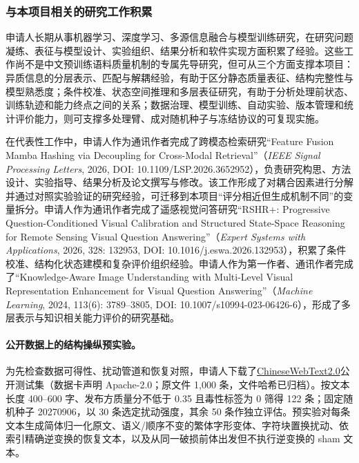 \justifying
\NSFCBodyText

\subsubsection{与本项目相关的研究工作积累}

申请人长期从事机器学习、深度学习、多源信息融合与模型训练研究，在研究问题凝练、表征与模型设计、实验组织、结果分析和软件实现方面积累了经验。这些工作尚不是中文预训练语料质量机制的专属先导研究，但可从三个方面支撑本项目：异质信息的分层表示、匹配与解耦经验，有助于区分静态质量表征、结构完整性与模型熟悉度；条件校准、状态空间推理和多层表征研究，有助于分析处理前状态、训练轨迹和能力终点之间的关系；数据治理、模型训练、自动实验、版本管理和统计评价能力，则可支撑多处理臂、成对随机种子与冻结协议的可复现实施。

在代表性工作中，申请人作为通讯作者完成了跨模态检索研究“Feature Fusion Mamba Hashing via Decoupling for Cross-Modal Retrieval”（\emph{IEEE Signal Processing Letters}, 2026, DOI: 10.1109/LSP.2026.3652952），负责研究构思、方法设计、实验指导、结果分析及论文撰写与修改。该工作形成了对耦合因素进行分解并通过对照实验验证的研究经验，可迁移到本项目“评分相近但生成机制不同”的变量拆分。申请人作为通讯作者完成了遥感视觉问答研究“RSHR+: Progressive Question-Conditioned Visual Calibration and Structured State-Space Reasoning for Remote Sensing Visual Question Answering”（\emph{Expert Systems with Applications}, 2026, 328: 132953, DOI: 10.1016/j.eswa.2026.132953），积累了条件校准、结构化状态建模和复杂评价组织经验。申请人作为第一作者、通讯作者完成了“Knowledge-Aware Image Understanding with Multi-Level Visual Representation Enhancement for Visual Question Answering”（\emph{Machine Learning}, 2024, 113(6): 3789--3805, DOI: 10.1007/s10994-023-06426-6），形成了多层表示与知识相关能力评价的研究基础。

\paragraph{公开数据上的结构操纵预实验。}为先检查数据可得性、扰动管道和恢复对照，申请人下载了\href{https://huggingface.co/datasets/CASIA-LM/ChineseWebText2.0}{ChineseWebText2.0}公开测试集（数据卡声明 Apache-2.0；原文件 1,000 条，文件哈希已归档）。按文本长度 400--600 字、发布方质量分不低于 0.35 且毒性标签为 0 筛得 122 条；固定随机种子 20270906，以 30 条选定扰动强度，其余 50 条作独立评估。预实验对每条文本生成简体归一化原文、语义/顺序不变的繁体字形变体、字符块置换扰动、依索引精确逆变换的恢复文本，以及从同一破损前体出发但不执行逆变换的 sham 文本。


